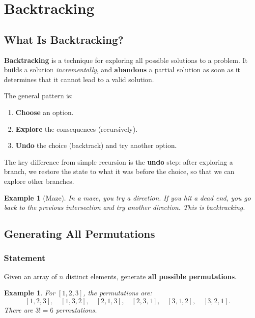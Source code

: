 \documentclass[11pt,a4paper]{article}
\newtheorem{example}[theorem]{Example}
\begin{document}
\section{Backtracking}

\subsection{What Is Backtracking?}

\textbf{Backtracking} is a technique for exploring all possible solutions to a problem. It builds a solution \emph{incrementally}, and \textbf{abandons} a partial solution as soon as it determines that it cannot lead to a valid solution.

The general pattern is:
\begin{enumerate}
    \item \textbf{Choose} an option.
    \item \textbf{Explore} the consequences (recursively).
    \item \textbf{Undo} the choice (backtrack) and try another option.
\end{enumerate}

The key difference from simple recursion is the \textbf{undo} step: after exploring a branch, we restore the state to what it was before the choice, so that we can explore other branches.

\begin{example}[Maze]
In a maze, you try a direction. If you hit a dead end, you \emph{go back} to the previous intersection and try another direction. This is backtracking.
\end{example}

\subsection{Generating All Permutations}

\subsubsection{Statement}

Given an array of $n$ distinct elements, generate \textbf{all possible permutations}.

\begin{example}
For $[1, 2, 3]$, the permutations are:
\[
[1,2,3], \quad [1,3,2], \quad [2,1,3], \quad [2,3,1], \quad [3,1,2], \quad [3,2,1].
\]
There are $3! = 6$ permutations.
\end{example}
\end{document}

